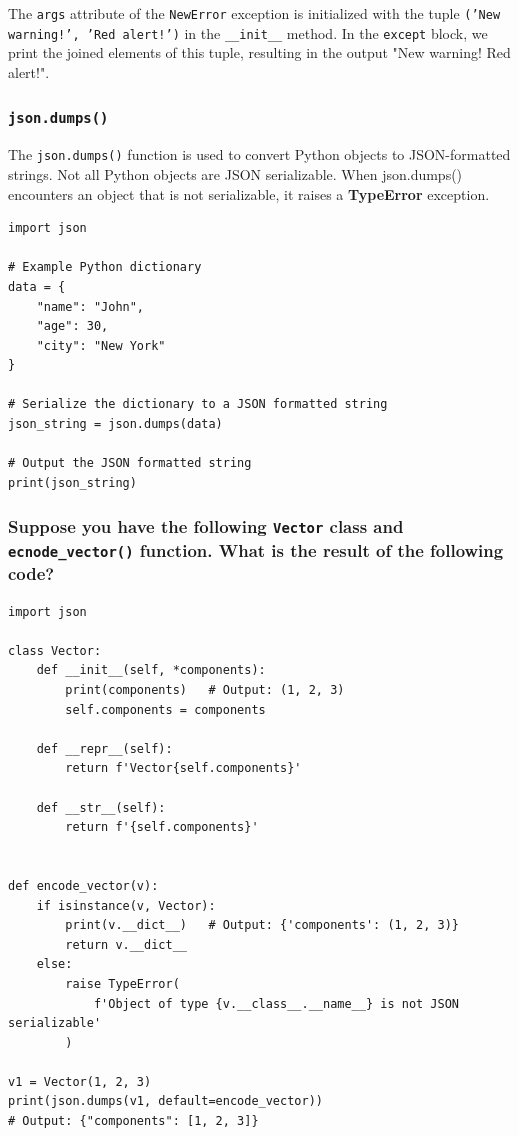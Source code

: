 The \texttt{args} attribute of the \texttt{NewError} exception is initialized with the tuple \texttt{('New warning!', 'Red alert!')} in the \texttt{\_\_init\_\_} method. In the \texttt{except} block, we print the joined elements of this tuple, resulting in the output "New warning! Red alert!".

\subsubsection{\texttt{json.dumps()}}
The \texttt{json.dumps()} function is used to convert Python objects to JSON-formatted strings. Not all Python objects are JSON serializable. When json.dumps() encounters an object that is not serializable, it raises a \textbf{TypeError} exception.

\begin{codebox}
\begin{verbatim}
import json

# Example Python dictionary
data = {
    "name": "John",
    "age": 30,
    "city": "New York"
}

# Serialize the dictionary to a JSON formatted string
json_string = json.dumps(data)

# Output the JSON formatted string
print(json_string)
\end{verbatim}
\end{codebox}

\newpage
\subsubsection{Suppose you have the following \texttt{Vector} class and \texttt{ecnode\_vector()} function. What is the result of the following code?}
\begin{codebox}
\begin{verbatim}
import json

class Vector:
    def __init__(self, *components):
        print(components)   # Output: (1, 2, 3)
        self.components = components
 
    def __repr__(self):
        return f'Vector{self.components}'
 
    def __str__(self):
        return f'{self.components}'
 
 
def encode_vector(v):
    if isinstance(v, Vector):
        print(v.__dict__)   # Output: {'components': (1, 2, 3)}
        return v.__dict__
    else:
        raise TypeError(
            f'Object of type {v.__class__.__name__} is not JSON serializable'
        )

v1 = Vector(1, 2, 3)
print(json.dumps(v1, default=encode_vector))   
# Output: {"components": [1, 2, 3]}
\end{verbatim}
\end{codebox}

